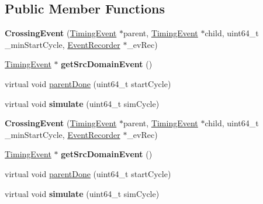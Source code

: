 \subsection*{Public Member Functions}
\begin{DoxyCompactItemize}
\item 
\hypertarget{classCrossingEvent_ab3416373c80cc905faaf615d69b539ed}{{\bfseries Crossing\-Event} (\hyperlink{classTimingEvent}{Timing\-Event} $\ast$parent, \hyperlink{classTimingEvent}{Timing\-Event} $\ast$child, uint64\-\_\-t \-\_\-min\-Start\-Cycle, \hyperlink{classEventRecorder}{Event\-Recorder} $\ast$\-\_\-ev\-Rec)}\label{classCrossingEvent_ab3416373c80cc905faaf615d69b539ed}

\item 
\hypertarget{classCrossingEvent_a275b5945ada8e357a0c07cf2428b9460}{\hyperlink{classTimingEvent}{Timing\-Event} $\ast$ {\bfseries get\-Src\-Domain\-Event} ()}\label{classCrossingEvent_a275b5945ada8e357a0c07cf2428b9460}

\item 
virtual void \hyperlink{classCrossingEvent_a96199fafd70da779df838f73f24cb6b5}{parent\-Done} (uint64\-\_\-t start\-Cycle)
\item 
\hypertarget{classCrossingEvent_a2ca00bf0b21769af20bc64b287bfaf74}{virtual void {\bfseries simulate} (uint64\-\_\-t sim\-Cycle)}\label{classCrossingEvent_a2ca00bf0b21769af20bc64b287bfaf74}

\item 
\hypertarget{classCrossingEvent_ab3416373c80cc905faaf615d69b539ed}{{\bfseries Crossing\-Event} (\hyperlink{classTimingEvent}{Timing\-Event} $\ast$parent, \hyperlink{classTimingEvent}{Timing\-Event} $\ast$child, uint64\-\_\-t \-\_\-min\-Start\-Cycle, \hyperlink{classEventRecorder}{Event\-Recorder} $\ast$\-\_\-ev\-Rec)}\label{classCrossingEvent_ab3416373c80cc905faaf615d69b539ed}

\item 
\hypertarget{classCrossingEvent_a275b5945ada8e357a0c07cf2428b9460}{\hyperlink{classTimingEvent}{Timing\-Event} $\ast$ {\bfseries get\-Src\-Domain\-Event} ()}\label{classCrossingEvent_a275b5945ada8e357a0c07cf2428b9460}

\item 
virtual void \hyperlink{classCrossingEvent_a29ef173f72101241b0d966c651cc8877}{parent\-Done} (uint64\-\_\-t start\-Cycle)
\item 
\hypertarget{classCrossingEvent_a6b144c2b5fa14b5c7128c01d57eced20}{virtual void {\bfseries simulate} (uint64\-\_\-t sim\-Cycle)}\label{classCrossingEvent_a6b144c2b5fa14b5c7128c01d57eced20}

\end{DoxyCompactItemize}
